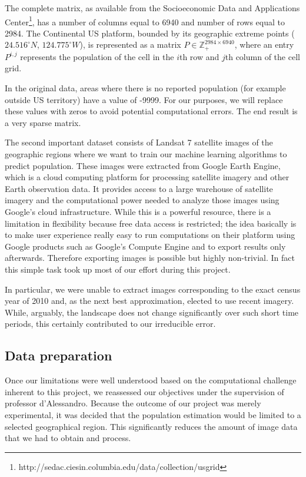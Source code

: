 \documentclass{article}
\begin{document}
The complete matrix, as available from the Socioeconomic Data and Applications Center\footnote{http://sedac.ciesin.columbia.edu/data/collection/usgrid}, has a number of columns equal to 6940 and number of rows equal to 2984. The Continental US platform, bounded by its geographic extreme points ($24.516^\circ N$, $124.775^\circ W$), is represented as a matrix $P\in\mathbb{Z}_+^{2984\times 6940}$,  where an entry $P^{i,j}$ represents the population of the cell in the $i$th row and $j$th column of the cell grid.

In the original data, areas where there is no reported population (for example outside US territory) have a value of -9999. For our purposes, we will replace these values with zeros to avoid potential computational errors. The end result is a very sparse matrix. 

The second important dataset consists of Landsat 7 satellite images of the geographic regions where we want to train our machine learning algorithms to predict population. These images were extracted from Google Earth Engine, which is a cloud computing platform for processing satellite imagery and other Earth observation data. It provides access to a large warehouse of satellite imagery and the computational power needed to analyze those images using Google's cloud infrastructure. While this is a powerful resource, there is a limitation in flexibility because free data access is restricted; the idea basically is to make user experience really easy to run computations on their platform using Google products such as Google’s Compute Engine and to export results only afterwards. Therefore exporting images is possible but highly non-trivial. In fact this simple task took up most of our effort during this project. 

In particular, we were unable to extract images corresponding to the exact census year of 2010 and, as the next best approximation, elected to use recent imagery. While, arguably, the landscape does not change significantly over such short time periods, this certainly contributed to our irreducible error.

\subsection{Data preparation}
Once our limitations were well understood based on the computational challenge inherent to this project, we reassessed our objectives under the supervision of professor d’Alessandro. Because the outcome of our project was merely experimental, it was decided that the population estimation would be limited to a selected geographical region. This significantly reduces the amount of image data that we had to obtain and process.
\end{document}
